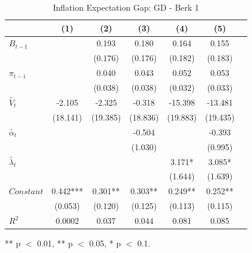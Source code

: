 \documentclass[review]{elsarticle}
\begin{document}
\begin{table}[!ht]
\centering 
  \caption{Inflation Expectation Gap: GD - Berk 1} 
  \label{tab:Inflation Expectation Gap}
\begin{tabular}{l*{6}{c}}   
\toprule
                    & (1) & (2) & (3) & (4) & (5) \\
\midrule
$B_{t-1}$           &     & 0.193 & 0.180 & 0.164 & 0.155 \\
                    &     & (0.176) & (0.176) & (0.182) & (0.183) \\
$\pi_{t-1}$         &     & 0.040 & 0.043 & 0.052 & 0.053 \\
                    &     & (0.038) & (0.038) & (0.032) & (0.033) \\
$\tilde{V_t}$       & -2.105 & -2.325 & -0.318 & -15.398 & -13.481 \\
                    & (18.141) & (19.385) & (18.836) & (19.883) & (19.435) \\
$\tilde{\alpha_t}$  &     &     & -0.504 &     & -0.393 \\
                    &     &     & (1.030) &     & (0.995) \\
$\tilde{\lambda_t}$ &     &     &     & 3.171* & 3.085* \\
                    &     &     &     & (1.644) & (1.639) \\
$Constant$          & 0.442*** & 0.301** & 0.303** & 0.249** & 0.252** \\
                    & (0.053) & (0.120) & (0.125) & (0.113) & (0.115) \\
\midrule
$R^2$               & 0.0002 & 0.037 & 0.044 & 0.081 & 0.085 \\
\bottomrule
\end{tabular} 
\parbox{0.8\textwidth}{\centering \small *** p $<$ 0.01, ** p $<$ 0.05, * p $<$ 0.1.}
\end{table}
\end{document}
